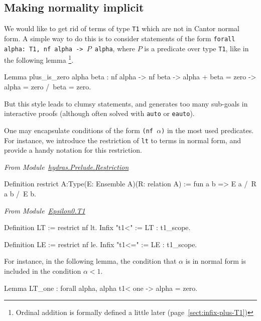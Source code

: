 \subsection{Making normality implicit}
  We would like to get rid of terms of type \texttt{T1} which are not in Cantor normal form.
A simple way to do this is to consider statements of the form 
\texttt{forall alpha: T1, nf alpha -> $P$ alpha}, where $P$ is a predicate over type \texttt{T1}, like in the following lemma \footnote{Ordinal addition is formally defined a little later (page~\ref{sect:infix-plus-T1})}.

\begin{Coqsrc}
Lemma plus_is_zero alpha beta :
  nf alpha -> nf beta ->
  alpha + beta  = zero -> alpha = zero /\  beta = zero.
\end{Coqsrc}

But this style leads to clumsy statements, and generates too many sub-goals in interactive proofs (although often solved with \texttt{auto} or \texttt{eauto}).

One may encapsulate conditions of the form \texttt{(nf $\alpha$)} in
the most used predicates. For instance, we introduce the restriction of \texttt{lt} to terms in normal form, and provide a handy notation for this restriction.

\vspace{4pt}
\emph{From Module~\href{../theories/html/hydras.Prelude.Restriction.html}{hydras.Prelude.Restriction}}

\begin{Coqsrc}
Definition restrict {A:Type}(E: Ensemble A)(R: relation A) :=
    fun a b => E a /\ R a b /\ E b.
 \end{Coqsrc}

 
\vspace{4pt}
\emph{From Module~\href{../theories/html/hydras.Epsilon0.T1.html\#LT}{Epsilon0.T1}}

\begin{Coqsrc}
Definition LT := restrict nf lt.
Infix "t1<" := LT : t1_scope.

Definition LE := restrict nf le.
Infix "t1<=" := LE : t1_scope.
\end{Coqsrc}


\label{Predicates:LT-T1}
 

For instance, in the following lemma, the condition that $\alpha$ is in normal form is included in the condition $\alpha< 1$.

\begin{Coqsrc}
Lemma LT_one : forall alpha, alpha t1< one -> alpha = zero.
\end{Coqsrc}

